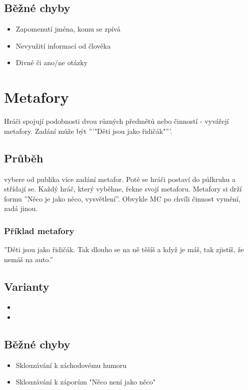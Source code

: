 \subsection{ Běžné chyby } \begin{itemize}
\item Zapomenutí jména, komu se zpívá
\item Nevyužití informací od člověka
\item Divné či ano/ne otázky
\end{itemize}
 
 
 
 
 
 
 
\needspace{5cm} \section{Metafory} \label{metafory}  
 
Hráči spojují podobnosti dvou různých předmětů nebo činností - vyvářejí metafory. Zadání může být '''"Děti jsou jako řidičák"'''. 
 
\subsection{Průběh}  
 vybere od publika více zadání metafor. Poté se hráči postaví do půlkruhu a střídají se. Každý hráč, který vyběhne, řekne svojí metaforu. Metafory si drží formu ''{Něco} je jako {něco}, {vysvětlení}''. Obvykle MC po chvíli činnost vymění, zadá jinou. 
 
\subsubsection{Příklad metafory}  
''Děti jsou jako řidičák. Tak dlouho se na ně těšíš a když je máš, tak zjistíš, že nemáš na auto.'' 
 
\subsection{ Varianty } \begin{itemize}
\item  {}
\item  {}
\end{itemize}
 
\subsection{ Běžné chyby } \begin{itemize}
\item  Sklouzávání k záchodovému humoru
\item  Sklouzávání k záporům "Něco není jako něco"
\end{itemize}
 
